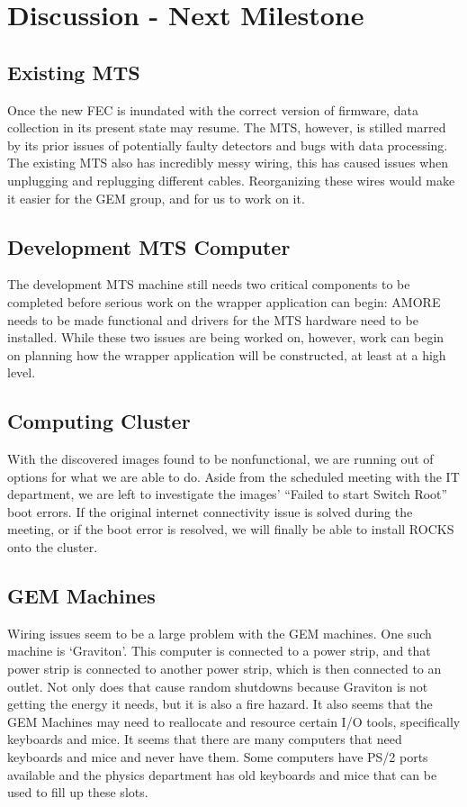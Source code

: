 \documentclass[12pt]{article}
\newcommand\tab[1][1cm]{\hspace*{#1}}
\begin{document}
\section{Discussion - Next Milestone}

\subsection{Existing MTS}

\tab Once the new FEC is inundated with the correct version of firmware, data
collection in its present state may resume. The MTS, however, is stilled marred
by its prior issues of potentially faulty detectors and bugs with data
processing. The existing MTS also has incredibly messy wiring, this has caused issues when unplugging and replugging different cables. Reorganizing these wires would make it easier for the GEM group, and for us to work on it. 

\subsection{Development MTS Computer}

\tab The development MTS machine still needs two critical components to be
completed before serious work on the wrapper application can begin: AMORE needs
to be made functional and drivers for the MTS hardware need to be
installed. While these two issues are being worked on, however, work can begin
on planning how the wrapper application will be constructed, at least at a high
level.

\subsection{Computing Cluster}

\tab With the discovered images found to be nonfunctional, we are running out of
options for what we are able to do. Aside from the scheduled meeting with the IT
department, we are left to investigate the images' ``Failed to start Switch
Root'' boot errors. If the original internet connectivity issue is solved during
the meeting, or if the boot error is resolved, we will finally be able to
install ROCKS onto the cluster.

\subsection{GEM Machines}
\tab Wiring issues seem to be a large problem with the GEM machines. One such machine is `Graviton'. This computer is connected to a power strip, and that power strip is connected to another power strip, which is then connected to an outlet. Not only does that cause random shutdowns because Graviton is not getting the energy it needs, but it is also a fire hazard. It also seems that the GEM Machines may need to reallocate and resource certain I/O tools, specifically keyboards and mice. It seems that there are many computers that need keyboards and mice and never have them. Some computers have PS/2 ports available and the physics department has old keyboards and mice that can be used to fill up these slots.  
\end{document}

